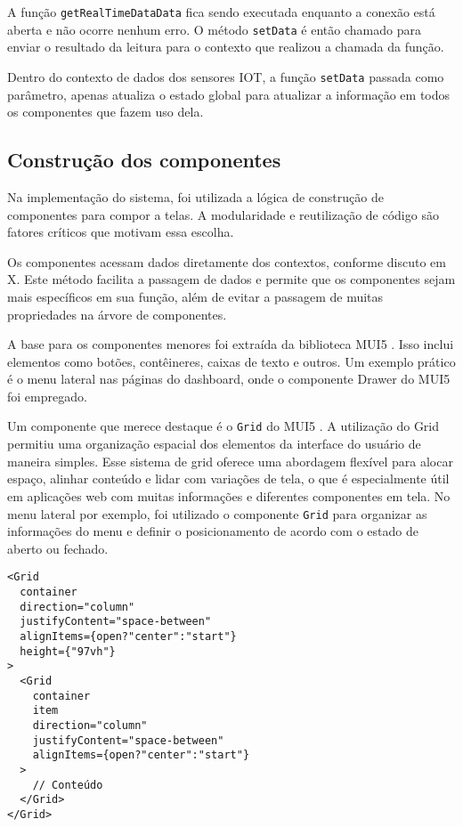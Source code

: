 A função \texttt{getRealTimeDataData} fica sendo executada enquanto a conexão está aberta e não ocorre nenhum erro. O método \texttt{setData} é então chamado para enviar o resultado da leitura para o contexto que realizou a chamada da função.

Dentro do contexto de dados dos sensores IOT, a função \texttt{setData} passada como parâmetro, apenas atualiza o estado global para atualizar a informação em todos os componentes que fazem uso dela.

\subsection{Construção dos componentes}\label{subsec:componentization}
Na implementação do sistema, foi utilizada a lógica de construção de componentes \cite{reactFirstComponent} para compor a telas. A modularidade e reutilização de código são fatores críticos que motivam essa escolha. 

Os componentes acessam dados diretamente dos contextos, conforme discuto em X. Este método facilita a passagem de dados e permite que os componentes sejam mais específicos em sua função, além de evitar a passagem de muitas propriedades na árvore de componentes.

A base para os componentes menores foi extraída da biblioteca \gls{MUI5} \cite{muiDocs}. Isso inclui elementos como botões, contêineres, caixas de texto e outros. Um exemplo prático é o menu lateral nas páginas do dashboard, onde o componente Drawer do \gls{MUI5} foi empregado. 

Um componente que merece destaque é o \texttt{Grid} do \gls{MUI5} \cite{muiReactGrid}. A utilização do Grid permitiu uma organização espacial dos elementos da interface do usuário de maneira simples. Esse sistema de grid oferece uma abordagem flexível para alocar espaço, alinhar conteúdo e lidar com variações de tela, o que é especialmente útil em aplicações web com muitas informações e diferentes componentes em tela. No menu lateral por exemplo, foi utilizado o componente \texttt{Grid} para organizar as informações do menu e definir o posicionamento de acordo com o estado de aberto ou fechado.

\begin{verbatim}
<Grid 
  container
  direction="column"
  justifyContent="space-between"
  alignItems={open?"center":"start"}
  height={"97vh"}
>
  <Grid 
    container
    item
    direction="column"
    justifyContent="space-between"
    alignItems={open?"center":"start"}
  >
    // Conteúdo
  </Grid>
</Grid>
\end{verbatim}


